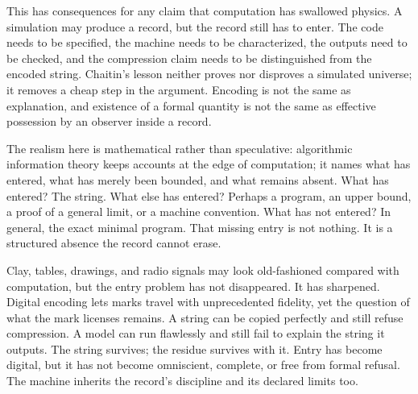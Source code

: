 This has consequences for any claim that computation has swallowed
physics. A simulation may produce a record, but the record still has to
enter. The code needs to be specified, the machine needs to be
characterized, the outputs need to be checked, and the compression claim
needs to be distinguished from the encoded string. Chaitin's lesson
neither proves nor disproves a simulated universe; it removes a cheap
step in the argument. Encoding is not the same as explanation, and
existence of a formal quantity is not the same as effective possession by
an observer inside a record.

The realism here is mathematical rather than speculative: algorithmic
information theory keeps accounts at the edge of computation; it names
what has entered, what has merely been bounded, and what remains absent.
What has entered? The string. What else has entered? Perhaps a program,
an upper bound, a proof of a general limit, or a machine convention.
What has not entered? In general, the exact minimal program. That
missing entry is not nothing. It is a structured absence the record
cannot erase.

Clay, tables, drawings, and radio signals may look old-fashioned compared
with computation, but the entry problem has not disappeared. It has sharpened.
Digital encoding lets marks travel with unprecedented fidelity, yet the
question of what the mark licenses remains. A string can be copied
perfectly and still refuse compression. A model can run flawlessly and
still fail to explain the string it outputs. The string survives; the
residue survives with it. Entry has become digital, but it has not
become omniscient, complete, or free from formal refusal. The machine
inherits the record's discipline and its declared limits too.

